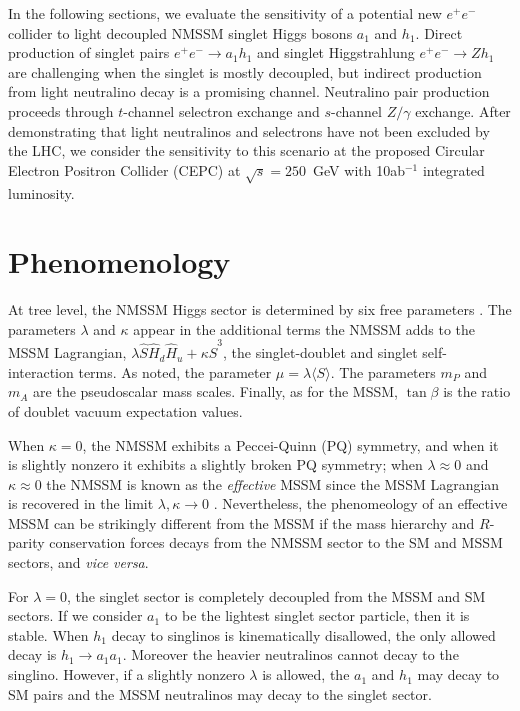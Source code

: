 \documentclass{ws-ijmpa}
\begin{document}
In the following sections, we evaluate the sensitivity of a potential new $e^+ e^-$ collider to light decoupled NMSSM singlet Higgs bosons $a_1$ and $h_1$. Direct production of singlet pairs $e^+ e^- \rightarrow a_1 h_1$ and singlet Higgstrahlung $e^+ e^- \rightarrow Z h_1$ are challenging when the singlet is mostly decoupled, but indirect production from light neutralino decay is a promising channel. Neutralino pair production proceeds through $t$-channel selectron exchange and $s$-channel $Z/\gamma$ exchange. 
After demonstrating that light neutralinos and selectrons have not been excluded by the LHC, we consider the sensitivity to this scenario at the proposed Circular Electron Positron Collider (CEPC) \cite{CEPC-SPPCStudyGroup:2015esa} at $\sqrt{s}=250$~GeV with 10ab$^{-1}$ integrated luminosity. 


\section{Phenomenology}

At tree level, the NMSSM Higgs sector is determined by six free parameters \cite{Ellwanger:2009dp}. The parameters $\lambda$ and $\kappa$ appear in the additional terms the NMSSM adds to the MSSM Lagrangian, $\lambda \hat{S} \hat{H}_{d} \hat{H}_{u}+\kappa \hat{S}^3$, the singlet-doublet and singlet self-interaction terms. As noted, the parameter $\mu = \lambda \langle S \rangle$. The parameters $m_{P}$ and $m_{A}$ are the pseudoscalar mass scales. Finally, as for the MSSM, $\tan \beta$ is the ratio of doublet vacuum expectation values.

When $\kappa=0$, the NMSSM exhibits a Peccei-Quinn (PQ) symmetry, and when it is slightly nonzero it exhibits a slightly broken PQ symmetry; when $\lambda\approx 0$ and $\kappa \approx0$ the NMSSM is known as the \emph{effective} MSSM since the MSSM Lagrangian is recovered in the limit $\lambda, \kappa \rightarrow 0$ \cite{Ellwanger:2009dp}. Nevertheless, the phenomeology of an effective MSSM can be strikingly different from the MSSM if the mass hierarchy and $R$-parity conservation forces decays from the NMSSM sector to the SM and MSSM sectors, and \emph{vice versa}.

For $\lambda=0$, the singlet sector is completely decoupled from the MSSM and SM sectors. If we consider $a_1$ to be the lightest singlet sector particle, then it is stable. When $h_1$ decay to singlinos is kinematically disallowed, the only allowed decay is $h_1 \rightarrow a_1 a_1$. Moreover the heavier neutralinos cannot decay to the singlino. However, if a slightly nonzero $\lambda$ is allowed, the $a_1$ and $h_1$ may decay to SM pairs and the MSSM neutralinos may decay to the singlet sector. 
\end{document}

